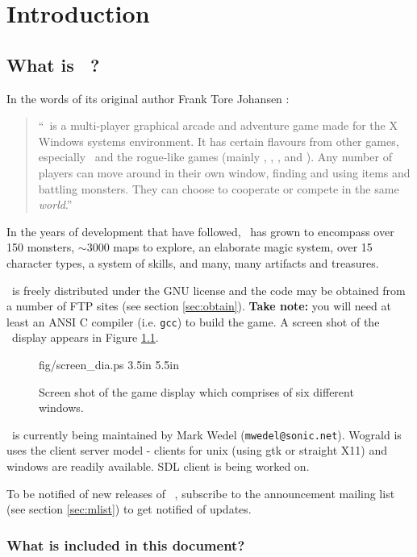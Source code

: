 
\chapter{Introduction}

\section{What is \cf\ ? }
 
In the words of its original author Frank Tore Johansen :
\begin{quote}
``\cf\ is a multi-player graphical arcade and adventure game made for the
X Windows systems environment. It has certain flavours from other games,
especially \gauntlet\ and the rogue-like  games (mainly \hack , \moria ,
\angband , and \ragnarok ). Any number of players can move around in their
own window, finding and using items and battling monsters. They can
choose to cooperate or compete in the same {\em world}.'' 
\end{quote}
In the years of development that have followed, \cf\ has grown to 
encompass over 150 monsters, $\sim$3000 maps to explore, an elaborate
magic system, over 15 character types, a system of skills, and
many, many artifacts and treasures. 

\cf\ is freely distributed under the GNU license and the code may be
obtained from a number of FTP sites (see section \ref{sec:obtain}).
{\bf Take note:} you will need at least an ANSI C compiler (i.e. {\tt gcc}) 
to build the game. A screen shot of the \cf\ display appears in Figure \ref{fig:dis}.

\begin{figure}   
\mongovaryboth fig/screen_dia.ps 3.5in 5.5in
\caption{Screen shot of the game display which comprises of six
different windows. \label{fig:dis}}
\end{figure}

\cf\ is currently being maintained by Mark Wedel ({\tt mwedel@sonic.net}).
Wograld is uses the client server model - clients for unix (using
gtk or straight X11) and windows are readily available.  SDL client
is being worked on.

To be notified of new releases of \cf\ ,
subscribe to the announcement mailing list
(see section \ref{sec:mlist}) to get notified of updates.

\subsection{What is included in this document?}  

